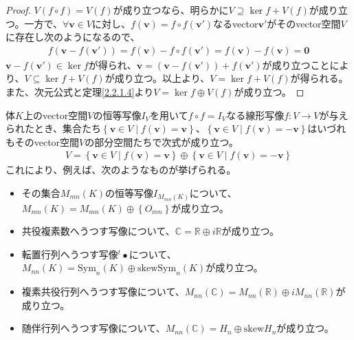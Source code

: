\documentclass[dvipdfmx]{jsarticle}
\begin{document}
\begin{proof}
$V(f \circ f) = V(f)$が成り立つなら、明らかに$V \supseteq \ker f + V(f)$が成り立つ。一方で、$\forall\mathbf{v} \in V$に対し、$f\left( \mathbf{v} \right) = f \circ f\left( \mathbf{v}' \right)$なるvector$\mathbf{v}'$がそのvector空間$V$に存在し次のようになるので、
\begin{align*}
f\left( \mathbf{v} - f\left( \mathbf{v}' \right) \right) = f\left( \mathbf{v} \right) - f \circ f\left( \mathbf{v}' \right) = f\left( \mathbf{v} \right) - f\left( \mathbf{v} \right) = \mathbf{0}
\end{align*}
$\mathbf{v} - f\left( \mathbf{v}' \right) \in \ker f$が得られ、$\mathbf{v} = \left( \mathbf{v} - f\left( \mathbf{v}' \right) \right) + f\left( \mathbf{v}' \right)$が成り立つことにより、$V \subseteq \ker f + V(f)$が成り立つ。以上より、$V = \ker f + V(f)$が得られる。また、次元公式と定理\ref{2.2.1.4}より$V = \ker f \oplus V(f)$が成り立つ。
\end{proof}
\begin{thm}\label{2.2.1.13}
体$K$上のvector空間$V$の恒等写像$I_{V}$を用いて$f \circ f = I_{V}$なる線形写像$f:V \rightarrow V$が与えられたとき、集合たち$\left\{ \mathbf{v} \in V \middle| f\left( \mathbf{v} \right) = \mathbf{v} \right\}$、$\left\{ \mathbf{v} \in V \middle| f\left( \mathbf{v} \right) = - \mathbf{v} \right\}$はいづれもそのvector空間$V$の部分空間たちで次式が成り立つ。
\begin{align*}
V = \left\{ \mathbf{v} \in V \middle| f\left( \mathbf{v} \right) = \mathbf{v} \right\} \oplus \left\{ \mathbf{v} \in V \middle| f\left( \mathbf{v} \right) = - \mathbf{v} \right\}
\end{align*}
これにより、例えば、次のようなものが挙げられる。
\begin{itemize}
\item
  その集合$M_{mn}(K)$の恒等写像$I_{M_{mn}(K)}$について、$M_{mn}(K) = M_{mn}(K) \oplus \left\{ O_{mn} \right\}$が成り立つ。
\item
  共役複素数へうつす写像について、$\mathbb{C} = \mathbb{R} \oplus i\mathbb{R}$が成り立つ。
\item
  転置行列へうつす写像$^{t} \bullet$について、$M_{nn}(K) = {\mathrm{Sym}}_{n}(K) \oplus {\mathrm{skew}}{{\mathrm{Sym}}_{n}(K)}$が成り立つ。
\item
  複素共役行列へうつす写像について、$M_{nn}\left( \mathbb{C} \right) = M_{nn}\left( \mathbb{R} \right) \oplus iM_{nn}\left( \mathbb{R} \right)$が成り立つ。
\item
  随伴行列へうつす写像について、$M_{nn}\left( \mathbb{C} \right) = H_{n} \oplus {\mathrm{skew}}H_{n}$が成り立つ。
\end{itemize}
\end{thm}
\end{document}
